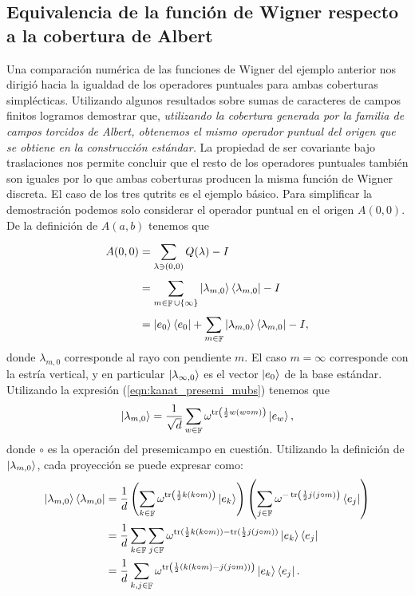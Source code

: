 \documentclass[a4paper,11pt]{report}
\DeclareMathOperator{\F}{\mathbb{F}}
\DeclareMathOperator{\tr}{tr}
\begin{document}
  \subsection{Equivalencia de la función de Wigner respecto
  a la cobertura de Albert}

  Una comparación numérica de las funciones de Wigner del
  ejemplo anterior nos dirigió hacia la igualdad de los
  operadores puntuales para ambas coberturas simplécticas.
  Utilizando algunos resultados sobre sumas de caracteres de
  campos finitos logramos demostrar que, \textit{utilizando
    la cobertura generada por la familia de campos torcidos
    de Albert, obtenemos el mismo operador puntual del
    origen que se obtiene en la construcción estándar.} La
    propiedad de
  ser covariante bajo traslaciones nos permite concluir que
  el resto de los operadores puntuales también son iguales
  por lo que ambas coberturas producen la misma función de
  Wigner discreta. El caso de los tres qutrits es el ejemplo
  básico. Para simplificar la demostración podemos solo
  considerar el operador puntual en el origen $A(0,0)$. De
  la definición de $A(a,b)$ tenemos que
  \begin{align}
    A(0,0)
    &= \sum_{\lambda \ni (0,0)}^{} Q(\lambda) - I \\
    &= \sum_{m \in \F \cup \{\infty\}}^{} \ket{\lambda_{m,0}}
    \bra{\lambda_{m,0}} - I \\
    &= \ket{e_0}\bra{e_0}
    + \sum_{m \in \F}^{}
    \ket{\lambda_{m,0}}\bra{\lambda_{m,0}} - I,
    \label{eqn:expanded_origin_op}
  \end{align}
  donde $\lambda_{m,0}$ corresponde al rayo con pendiente
  $m$. El caso $m = \infty$ corresponde con la estría
  vertical, y en particular $\ket{\lambda_{\infty,0}}$ es el
  vector $\ket{e_0}$ de la base estándar. Utilizando la
  expresión (\ref{eqn:kanat_presemi_mubs}) tenemos que
  \begin{equation}
    \ket{\lambda_{m,0}}
    = \frac{1}{\sqrt{d}} \sum_{w \in \F}^{}
    \omega^{\tr\left( \frac{1}{2} w(w\circ m) \right) }
    \ket{e_w},
  \end{equation}
  donde $\circ$ es la operación del presemicampo en
  cuestión. Utilizando la definición de
  $\ket{\lambda_{m,0}}$, cada proyección se puede expresar
  como:
  \begin{align}
    \ket{\lambda_{m,0}} \bra{\lambda_{m,0}}
    &= \frac{1}{d} 
    \left(
      \sum_{k \in \F}^{} \omega^{\tr\left( \frac{1}{2}
      k(k\circ m) \right) }
      \ket{e_k}
    \right) 
    \left(
      \sum_{j \in \F}^{} \omega^{-\tr\left( \frac{1}{2}
      j(j \circ m) \right) }
      \bra{e_j}
    \right) \\
    &= \frac{1}{d}
    \sum_{k \in \F}^{} \sum_{j \in \F}^{} 
    \omega^{\tr( \frac{1}{2} k(k\circ m)) - \tr( \frac{1}{2}
    j(j \circ m))} 
    \ket{e_k} \bra{e_j} \\
    &= \frac{1}{d}
    \sum_{k, j \in \F}^{} 
    \omega^{\tr\left( \frac{1}{2} \left( 
          k(k\circ m) - j(j\circ m)
    \right)  \right) } \ket{e_k} \bra{e_j}.
  \end{align}  
\end{document}
